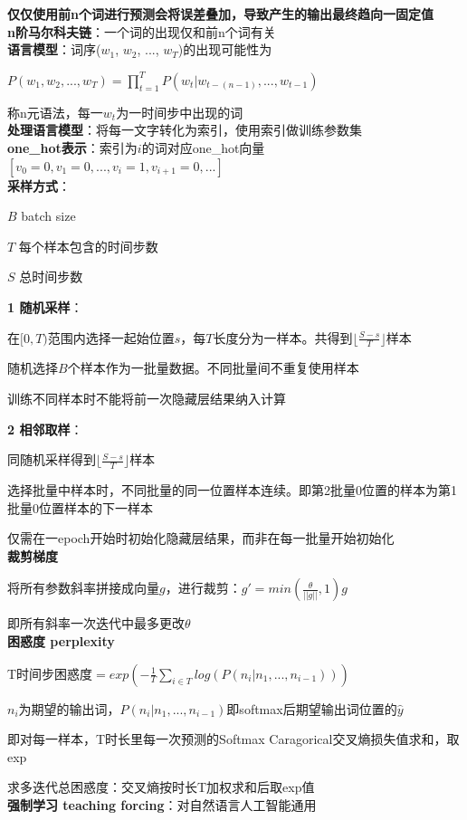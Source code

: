 \documentclass[UTF8]{ctexart}
\begin{document}
  \textbf{仅仅使用前n个词进行预测会将误差叠加，导致产生的输出最终趋向一固定值}\\
\textbf{n阶马尔科夫链}：一个词的出现仅和前n个词有关\\
\textbf{语言模型}：词序($w_1$, $w_2$, ..., $w_T$)的出现可能性为

  $P(w_1, w_2,...,w_T) = \prod_{t=1}^{T} P(w_t|w_{t-(n-1)},...,w_{t-1})$

  称n元语法，每一$w_t$为一时间步中出现的词\\
\textbf{处理语言模型}：将每一文字转化为索引，使用索引做训练参数集\\
\textbf{one\_hot表示}：索引为$i$的词对应one\_hot向量$[v_0 = 0, v_1 = 0, ..., v_i = 1, v_{i+1} = 0, ...]$\\
\textbf{采样方式}：

  $B$ batch size
  
  $T$ 每个样本包含的时间步数

  $S$ 总时间步数

  \textbf{1 随机采样}：

  \quad 在$[0, T)$范围内选择一起始位置$s$，每$T$长度分为一样本。共得到$\lfloor \frac{S - s}{T} \rfloor$样本

  \quad 随机选择$B$个样本作为一批量数据。不同批量间不重复使用样本

  \quad 训练不同样本时不能将前一次隐藏层结果纳入计算
  
  \textbf{2 相邻取样}：

  \quad 同随机采样得到$\lfloor \frac{S - s}{T} \rfloor$样本

  \quad 选择批量中样本时，不同批量的同一位置样本连续。即第2批量0位置的样本为第1批量0位置样本的下一样本

  \quad 仅需在一epoch开始时初始化隐藏层结果，而非在每一批量开始初始化\\
\textbf{裁剪梯度}

  将所有参数斜率拼接成向量$g$，进行裁剪：$g' = min(\frac{\theta}{||g||}, 1)g$
  
  \quad 即所有斜率一次迭代中最多更改$\theta$\\
\textbf{困惑度 perplexity}

  T时间步困惑度$ = exp(-\frac{1}{T}\sum_{i \in T} log(P(n_i | n_1, ..., n_{i-1})))$

  \quad $n_i$为期望的输出词，$P(n_i | n_1, ..., n_{i-1})$即softmax后期望输出词位置的$\hat{y}$

  \quad 即对每一样本，T时长里每一次预测的Softmax Caragorical交叉熵损失值求和，取exp
  
  求多迭代总困惑度：交叉熵按时长T加权求和后取exp值\\
\textbf{强制学习 teaching forcing}：对自然语言人工智能通用
\end{document}
